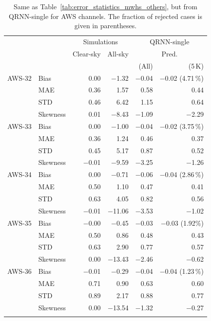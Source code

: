 \documentclass[amt, manuscript]{copernicus}
\begin{document}
\begin{table}[t]
	\caption{Same as Table~\ref{tab:error_statistics_mwhs_others}, but from QRNN-single for AWS channels. The fraction of rejected cases is given in parentheses. }
	\label{tab:statistics_qrnn_aws}
	\begin{tabular}{llrr|rr}
		\tophline
		&&\multicolumn{2}{c|}{Simulations}& \multicolumn{2}{c}{QRNN-single} \\
		\cline{3-6}
		&&Clear-sky &   All-sky &  \multicolumn{2}{c}{Pred.}  \\
		&&   &    &   (All) & (5\,K) \\
		\middlehline
		AWS-32  &Bias     & 0.00 &$-$1.32 &$-$0.04 &$-$0.02 (4.71\,\%) \\
				&MAE      & 0.36 &  1.57 &  0.58 &  0.44 \\
				&STD      & 0.46 &  6.42 &  1.15 &  0.64 \\
				&Skewness & 0.01 &$-$8.43 &$-$1.09 &$-$2.29 \\
		\middlehline
		AWS-33	&Bias     &  0.00 &$-$1.00 &$-$0.04 &$-$0.02 (3.75\,\%)  \\
				&MAE      &  0.36 &  1.24 &  0.46 &  0.37  \\
				&STD      &  0.45 &  5.17 &  0.87 &  0.52  \\
				&Skewness &$-$0.01 &$-$9.59 &$-$3.25 &$-$1.26  \\
		
		\middlehline
		AWS-34	&Bias    &  0.00 & $-$0.71 &$-$0.06 &$-$0.04 (2.86\,\%)  \\
				&MAE      &  0.50 &   1.10 &  0.47 &  0.41  \\
				&STD      &  0.63 &   4.05 &  0.82 &  0.56  \\
				&Skewness &$-$0.01 &$-$11.06 &$-$3.53 &$-$1.02  \\
		\middlehline
		AWS-35	&Bias    &$-$0.00 & $-$0.45 &$-$0.03 &$-$0.03 (1.92\%)  \\
				&MAE      &  0.50 &   0.86 &  0.48 &  0.43  \\
				&STD      &  0.63 &   2.90 &  0.77 &  0.57  \\
				&Skewness &  0.00 &$-$13.43 &$-$2.46 &$-$0.62  \\
		\middlehline
		AWS-36  &Bias    &$-$0.01 & $-$0.29 &$-$0.04 &$-$0.04 (1.23\,\%)  \\
				&MAE      &  0.71 &   0.90 &  0.63 &  0.60  \\
				&STD      &  0.89 &   2.17 &  0.88 &  0.77  \\
				&Skewness &  0.00 &$-$13.54 &$-$1.32 &$-$0.27  \\
		\bottomhline				
	\end{tabular}
	\belowtable{} %
\end{table}
\end{document}
